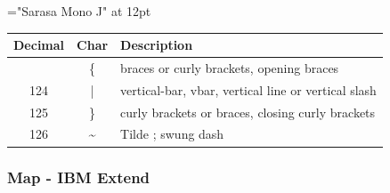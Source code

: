 {\font\rm="Sarasa Mono J" at 12pt \rm

\begin{longtable}{|c|c|l|}
\hline
\textbf{Decimal} & \textbf{Char} & \textbf{Description} \\
\hline
\endhead
\hline
\endfoot
\hline
\endlastfoot
123 & \{ & braces or curly brackets, opening braces \\
\hline
124 & | & vertical-bar, vbar, vertical line or vertical slash \\
\hline
125 & \} & curly brackets or braces, closing curly brackets \\
\hline
126 & \textasciitilde{} & Tilde ; swung dash \\
\hline

\end{longtable}

}



\subsubsection{Map - IBM Extend}

